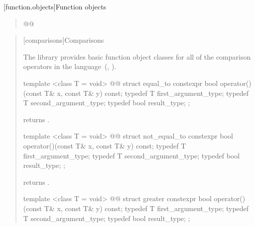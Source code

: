 \setcounter{section}{8}
[function.objects]{Function objects}


\begin{quote}
\setcounter{Paras}{1}
\pnum
{}

\begin{codeblock}
  @@
\end{codeblock}
\end{quote}


\begin{quote}
\setcounter{subsection}{5}
[comparisons]{Comparisons}

\pnum
The library provides basic function object classes for all of the comparison
operators in the language~(, ).

%
\begin{itemdecl}
template <class T = void>
  @@
struct equal_to {
  constexpr bool operator()(const T& x, const T& y) const;
  typedef T first_argument_type;
  typedef T second_argument_type;
  typedef bool result_type;
};
\end{itemdecl}

\begin{itemdescr}
\pnum
{} returns .
\end{itemdescr}

%
\begin{itemdecl}
template <class T = void>
  @@
struct not_equal_to {
  constexpr bool operator()(const T& x, const T& y) const;
  typedef T first_argument_type;
  typedef T second_argument_type;
  typedef bool result_type;
};
\end{itemdecl}

\begin{itemdescr}
\pnum
{} returns .
\end{itemdescr}

%
\begin{itemdecl}
template <class T = void>
  @@
struct greater {
  constexpr bool operator()(const T& x, const T& y) const;
  typedef T first_argument_type;
  typedef T second_argument_type;
  typedef bool result_type;
};
\end{itemdecl}


\end{quote}
